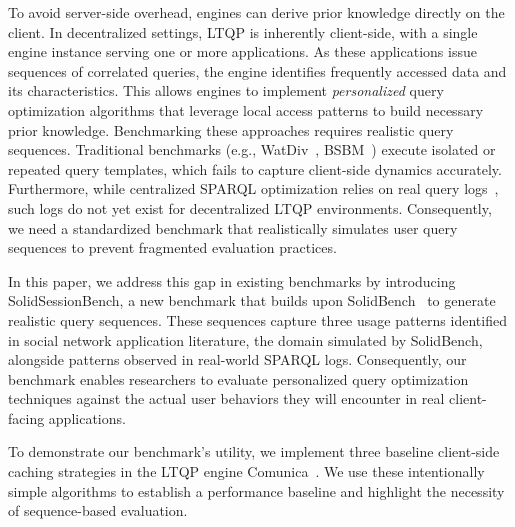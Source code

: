 To avoid server-side overhead, engines can derive prior knowledge directly on the client.
In decentralized settings, LTQP is inherently client-side, with a single engine instance serving one or more applications.
As these applications issue sequences of correlated queries,
the engine identifies frequently accessed data and its characteristics.
This allows engines to implement \emph{personalized} query optimization algorithms 
that leverage local access patterns to build necessary prior knowledge.
Benchmarking these approaches requires realistic query sequences.
Traditional benchmarks (e.g., WatDiv~\cite{alucc2014diversified}, BSBM~\cite{bizer2011berlin}) 
execute isolated or repeated query templates, which fails to capture client-side dynamics accurately. 
Furthermore, while centralized SPARQL optimization relies on
real query logs~\cite{berendt2013usewod2013,picalausa_what_2011,bonifati_darql_2018,stadler2024lsq}, 
such logs do not yet exist for decentralized LTQP environments. 
Consequently, we need a standardized benchmark that realistically simulates user query sequences 
to prevent fragmented evaluation practices.

In this paper, we address this gap in existing benchmarks by introducing SolidSessionBench, a new benchmark that builds upon SolidBench~\cite{taelman2023link} to generate realistic query sequences.
These sequences capture three usage patterns identified in social network application literature,
the domain simulated by SolidBench, alongside patterns observed in real-world SPARQL logs.
Consequently, our benchmark enables researchers to evaluate personalized query optimization techniques 
against the actual user behaviors they will encounter in real client-facing applications.

To demonstrate our benchmark's utility, 
we implement three baseline client-side caching strategies 
in the LTQP engine Comunica~\cite{taelman2018comunica,taelman2023link}.
We use these intentionally simple algorithms to establish a performance baseline 
and highlight the necessity of sequence-based evaluation.